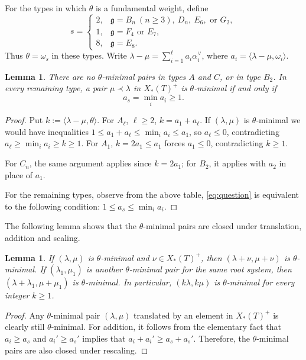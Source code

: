\documentclass[a4paper, 12pt]{amsart}
\newtheorem{lemma}[theorem]{Lemma}
\theoremstyle{definition}
\newcommand{\g}{\mathfrak g}
\begin{document}
For the types in which $\theta$ is a fundamental weight, define
\begin{equation}\label{eq:node}
s=\begin{cases}
2,&\g=B_n\ (n\ge3),\ D_n,\ E_6,\text{ or }G_2,\\
1,&\g=F_4\text{ or }E_7,\\
8,&\g=E_8.
\end{cases}
\end{equation}
Thus $\theta=\omega_s$ in these types. Write
$\lambda-\mu=\sum_{i=1}^\ell a_i\alpha_i^\vee$, where
$a_i=\langle\lambda-\mu,\omega_i\rangle$.

\begin{lemma}\label{lem:criterion}
There are no $\theta$-minimal pairs in types $A$ and $C$, or in type
$B_2$. In every remaining type, a pair $\mu\prec\lambda$ in
$X_*(T)^+$ is $\theta$-minimal if and only if
\begin{equation}\label{eq:criterion}
a_s=\min_i a_i\geq1.
\end{equation}
\end{lemma}
\begin{proof}
Put $k:=\langle\lambda-\mu,\theta\rangle$. For $A_\ell$, $\ell\ge2$, $k=a_1+a_\ell$. If $(\lambda, \mu)$ is $\theta$-minimal we would have inequalities $1\le a_1+a_\ell\le\min_ia_i\le a_1$, so $a_\ell\le0$, contradicting $a_\ell\ge\min_ia_i\ge k\ge1$. For $A_1$, $k=2a_1\le a_1$ forces $a_1\le0$, contradicting $k\ge1$. 

For $C_n$, the same argument applies since $k=2a_1$; for $B_2$, it applies with $a_2$ in place of $a_1$.

For the remaining types, observe from the above table,  \eqref{eq:question}  is equivalent to the following condition:
$1\leq  a_s\le\min_i a_i$.
\end{proof}

The following lemma shows that the $\theta$-minimal pairs are closed under translation, addition and scaling.
\begin{lemma}\label{lem:operations}
If $(\lambda,\mu)$ is $\theta$-minimal and $\nu\in X_*(T)^+$, then
$ (\lambda+\nu,\mu+\nu)$
is $\theta$-minimal. If $(\lambda_1,\mu_1)$ is another $\theta$-minimal pair
for the same root system, then
$ (\lambda+\lambda_1,\mu+\mu_1)$
is $\theta$-minimal. In particular, $(k\lambda,k\mu)$ is $\theta$-minimal for
every integer $k\ge1$.
\end{lemma}
\begin{proof}
Any $\theta$-minimal pair $(\lambda,\mu)$ translated by an element in $X_*(T)^+$ is clearly still $\theta$-minimal. 
For addition, it follows from the elementary fact that  $a_i\ge a_s$ and $a_i'\ge a_s'$ implies that
$a_i+a_i'\ge a_s+a_s'$. Therefore, the $
\theta$-minimal pairs are also closed under rescaling. 
\end{proof}
\end{document}
